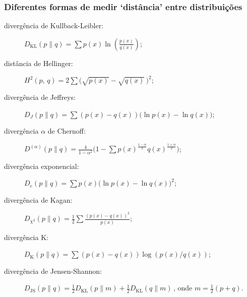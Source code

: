 \begin{frame}%
  \frametitle{Diferentes formas de medir `distância' entre distribuições}

  \begin{description}
  \item[divergência de Kullback-Leibler:] $D_\mathrm{KL}(p \parallel q) = \sum p(x)\ln\left( \frac{p(x)}{q(x)}\right) $;
  \item[distância de Hellinger:] $H^2(p,\, q) = 2 \sum \Big( \sqrt{p(x)} - \sqrt{q(x)}\, \Big)^2 $;
  \item[divergência de Jeffreys:] $D_J(p \parallel q) = \sum (p(x) - q(x))\big( \ln p(x) - \ln q(x) \big) $;
  \item[divergência $\alpha$ de Chernoff:] $D^{(\alpha)}(p \parallel q) = \frac{4}{1-\alpha^2}\bigg(1 - \sum p(x)^\frac{1-\alpha}{2} q(x)^\frac{1+\alpha}{2}  \bigg) $;
  \item[divergência exponencial:] $D_e(p \parallel q) = \sum p(x)\big( \ln p(x) - \ln q(x) \big)^2$;
  \item[divergência de Kagan:] $D_{\chi^2}(p \parallel q) = \frac12 \sum \frac{(p(x) - q(x))^2}{p(x)}$;
  \item[divergência K:] $D_{\mathrm{K}}(p \parallel q) = \sum (p(x) - q(x)) \log(p(x)/q(x))$;
  \item[divergência de Jensen-Shannon:] $D_{\mathrm{JS}}(p \parallel q) = \tfrac{1}{2} D_{\mathrm{KL}} \left (p \parallel m \right ) + \tfrac{1}{2} D_{\mathrm{KL}}\left (q \parallel m \right )\, \!$, onde $m = \tfrac{1}{2}(p+q)$.
  \end{description}
\end{frame}

